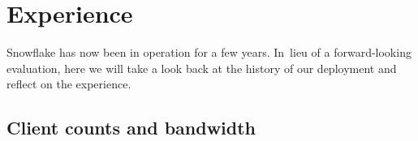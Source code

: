 \documentclass[letterpaper,twocolumn]{article}
\begin{document}
\begin{figure}[t]
{%
}
\label{fig:client-counts}
\end{figure}

\section{Experience}
\label{sec:experience}

Snowflake has now been in operation for a few years.
In~lieu of a forward-looking evaluation,
here we will take a look back
at the history of our deployment
and reflect on the experience.

\subsection{Client counts and bandwidth}
\label{sec:clients}
\end{document}
